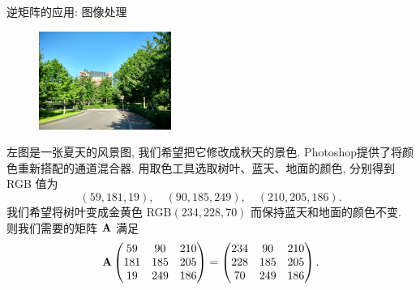 \begin{frame}{逆矩阵的应用: 图像处理\noexer}
	\begin{figure}
		\centering
		\includegraphics[height=32mm]{../image/ps_in.jpg}
	\end{figure}
	\onslide<+->
	左图是一张夏天的风景图, 我们希望把它修改成秋天的景色. 
	\onslide<+->
	Photoshop提供了将颜色重新搭配的通道混合器.
	\onslide<+->
	用取色工具选取树叶、蓝天、地面的颜色, 分别得到 RGB 值为
	\[(59,181,19),\quad (90,185,249),\quad (210,205,186).\]
	\onslide<+->
	我们希望将树叶变成金黄色 RGB$(234,228,70)$ 而保持蓝天和地面的颜色不变.
	\onslide<+->
	则我们需要的矩阵 ${\mathbf{A}}$ 满足
	\[{\mathbf{A}}\begin{pmatrix}
		59&90&210\\
		181&185&205\\
		19&249&186
	\end{pmatrix}=\begin{pmatrix}
		234&90&210\\
		228&185&205\\
		70&249&186
	\end{pmatrix}.\]
\end{frame}


